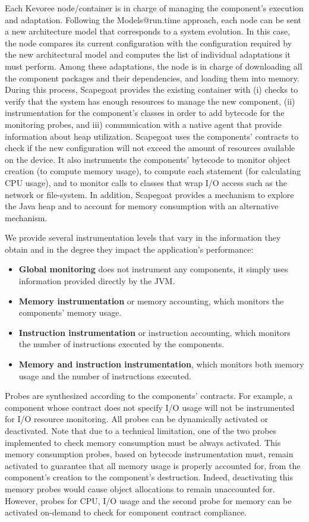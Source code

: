 Each Kevoree node/container is in charge of managing the component's execution and adaptation.
Following the Models@run.time approach, each node can be sent a new architecture model that corresponds to a system evolution.
In this case, the node compares its current configuration with the configuration required by the new architectural model and computes the list of individual adaptations it must perform.
Among these adaptations, the node is in charge of downloading all the component packages and their dependencies, and loading them into memory.
During this process, Scapegoat provides the existing container with (i) checks to verify that the system has enough resources to manage the new component, (ii) instrumentation for the component's classes in order to add bytecode for the monitoring probes, and iii) communication with a native agent that provide information about heap utilization.
Scapegoat uses the components' contracts to check if the new configuration will not exceed the amount of resources available on the device.
It also instruments the components' bytecode to monitor object creation (to compute memory usage), to compute each statement (for calculating CPU usage), and to monitor calls to classes that wrap I/O access such as the network or file-system.
In addition, Scapegoat provides a mechanism to explore the Java heap and to account for memory consumption with an alternative mechanism.

We provide several instrumentation levels that vary in the information they obtain and in the degree they impact the application's performance:
\begin{itemize}
\leftskip -.2in
	\item \textbf{Global monitoring} does not instrument any components, it simply uses information provided directly by the JVM.
	\item \textbf{Memory instrumentation} or memory accounting, which monitors the components' memory usage.
	\item \textbf{Instruction instrumentation} or instruction accounting, which monitors the number of instructions executed by the components.
	\item \textbf{Memory and instruction instrumentation}, which monitors both memory usage and the number of instructions executed.	
\end{itemize}

Probes are synthesized according to the components' contracts.
For example, a component whose contract does not specify I/O usage will not be instrumented for I/O resource monitoring.
All probes can be dynamically activated or deactivated.
Note that due to a technical limitation, one of the two probes implemented to check memory consumption must be always activated.  
This memory consumption probes, based on bytecode instrumentation must, remain activated to guarantee that all memory usage is properly accounted for, from the component's creation to the component's destruction.
Indeed, deactivating this memory probes would cause object allocations to remain unaccounted for.
However, probes for CPU, I/O usage and the second probe for memory can be activated on-demand to check for component contract compliance.

